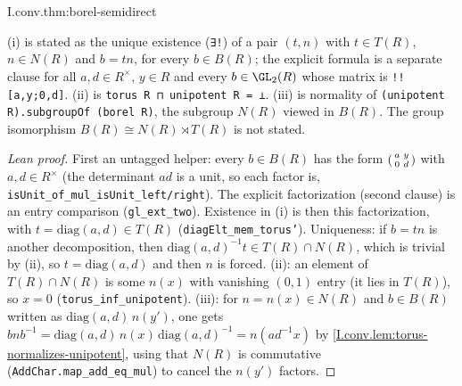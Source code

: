 \begin{theorem}[$B=T\ltimes N$]
\end{theorem}
\begin{tfformal}{I.conv.thm:borel-semidirect}
\begin{tffidelity}
(i) is stated as the unique existence (\texttt{∃!}) of a pair $(t,n)$ with $t\in T(R)$, $n\in N(R)$ and $b=tn$, for every $b\in B(R)$; the explicit formula is a separate clause for all $a,d\in R^\times$, $y\in R$ and every $b\in\GL_2(R)$ whose matrix is \texttt{!![a,y;0,d]}. (ii) is \texttt{torus R ⊓ unipotent R = ⊥}. (iii) is normality of \texttt{(unipotent R).subgroupOf (borel R)}, the subgroup $N(R)$ viewed in $B(R)$. The group isomorphism $B(R)\cong N(R)\rtimes T(R)$ is not stated.
\end{tffidelity}
\end{tfformal}
\begin{proof}[Lean proof]
First an untagged helper: every $b\in B(R)$ has the form $\begin{psmallmatrix}a&y\\0&d\end{psmallmatrix}$ with $a,d\in R^\times$ (the determinant $ad$ is a unit, so each factor is, \texttt{isUnit\_of\_mul\_isUnit\_left/right}). The explicit factorization (second clause) is an entry comparison (\texttt{gl\_ext\_two}). Existence in (i) is then this factorization, with $t=\mathrm{diag}(a,d)\in T(R)$ (\texttt{diagElt\_mem\_torus'}). Uniqueness: if $b=tn$ is another decomposition, then $\mathrm{diag}(a,d)^{-1}t\in T(R)\cap N(R)$, which is trivial by (ii), so $t=\mathrm{diag}(a,d)$ and then $n$ is forced. (ii): an element of $T(R)\cap N(R)$ is some $n(x)$ with vanishing $(0,1)$ entry (it lies in $T(R)$), so $x=0$ (\texttt{torus\_inf\_unipotent}). (iii): for $n=n(x)\in N(R)$ and $b\in B(R)$ written as $\mathrm{diag}(a,d)\,n(y')$, one gets $bnb^{-1}=\mathrm{diag}(a,d)\,n(x)\,\mathrm{diag}(a,d)^{-1}=n(ad^{-1}x)$ by \cref{I.conv.lem:torus-normalizes-unipotent}, using that $N(R)$ is commutative (\texttt{AddChar.map\_add\_eq\_mul}) to cancel the $n(y')$ factors.
\end{proof}

